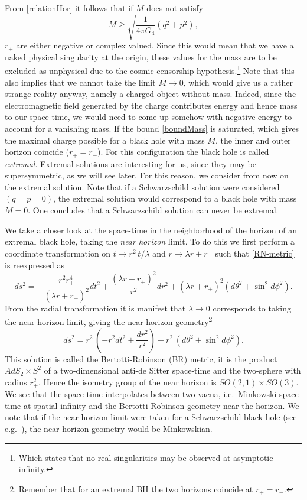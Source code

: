 \documentclass[12pt,twoside]{book}
\begin{document}
From \eqref{relationHor} it follows that if $M$ does not satisfy
\begin{equation}\label{boundMass}
M \geq \sqrt{ \frac{1}{4\pi G_{4}} \left( q^{2} + p^{2} \right) },
\end{equation}
$r_{\pm}$ are either negative or complex valued. Since this would mean that we have a naked physical singularity at the origin, these values for the mass are to be excluded as unphysical due to the cosmic censorship hypothesis.\footnote{Which states that no real singularities may be observed at asymptotic infinity.} Note that this also implies that we cannot take the limit $M\rightarrow 0$, which would give us a rather strange reality anyway, namely a charged object without mass. Indeed, since the electromagnetic field generated by the charge contributes energy and hence mass to our space-time, we would need to come up somehow with negative energy to account for a vanishing mass.
If the bound \eqref{boundMass} is saturated, which gives the maximal charge possible for a black hole with mass $M$, the inner and outer horizon coincide ($r_{+} = r_{-}$). For this configuration the black hole is called \emph{extremal}. Extremal solutions are interesting for us, since they may be supersymmetric, as we will see later. For this reason, we consider from now on the extremal solution. Note that if a Schwarzschild solution were considered $(q = p = 0)$, the extremal solution would correspond to a black hole with mass $M = 0$. One concludes that a Schwarzschild solution can never be extremal.

We take a closer look at the space-time in the neighborhood of the horizon of an extremal black hole, taking the \emph{near horizon} limit. To do this we first perform a coordinate transformation on $t \rightarrow r^{2}_{+}t/\lambda$ and $r \rightarrow \lambda r + r_{+}$ such that \eqref{RN-metric} is reexpressed as
\begin{equation}
ds^{2} = -\frac{r^{2} r_{+}^{4}}{\left(\lambda r + r_{+}\right)^{2}}dt^{2} +
\frac{\left(\lambda r + r_{+}\right)^{2}}{r^{2}}dr^{2}+ \left(\lambda r + r_{+}\right)^{2}(d\theta^{2}+\sin^{2}d\phi^{2}).
\end{equation}
From the radial transformation it is manifest that $\lambda \rightarrow 0$ corresponds to taking the near horizon limit, giving the near horizon geometry\footnote{Remember that for an extremal BH the two horizons coincide at $r_{+} = r_{-}$.}
\begin{equation}\label{BR-metric}
ds^{2} = r^{2}_{+}\left( -r^{2}dt^{2} + \frac{dr^{2}}{r^{2}} \right) + r^{2}_{+} (d\theta^{2}+\sin^{2}d\phi^{2}).
\end{equation}
This solution is called the Bertotti-Robinson (BR) metric, it is the product $AdS_{2} \times S^{2}$ of a two-dimensional anti-de Sitter space-time and the two-sphere with radius $r^{2}_{+}$. Hence the isometry group of the near horizon is $SO(2,1) \times SO(3)$. We see that the space-time interpolates between two vacua, i.e.\ Min\-kowski space-time at spatial infinity and the Bertotti-Robinson geometry near the horizon. We note that if the near horizon limit were taken for a Schwarzschild black hole (see e.g.\ \cite{Dabholkar:2006iu}), the near horizon geometry would be Minkowskian.
\end{document}
